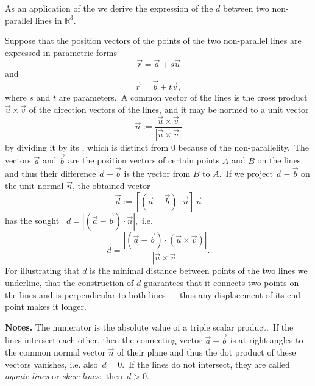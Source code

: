 \documentclass{article}
\theoremstyle{definition}
\begin{document}
As an application of the  we derive the expression of the  $d$ between two non-parallel  lines in $\mathbb{R}^3$.

Suppose that the position vectors of the points of the two non-parallel lines are expressed in parametric forms
           $$\vec{r} = \vec{a}\!+\!s\vec{u}$$
and
           $$\vec{r} = \vec{b}\!+\!t\vec{v},$$
where $s$ and $t$ are parameters.\, A common  vector of the lines is the cross product $\vec{u}\times\vec{v}$ of the direction vectors of the lines, and it may be normed to a unit vector
      $$\vec{n} := \frac{\vec{u}\!\times\!\vec{v}}{|\vec{u}\!\times\!\vec{v}|}$$
by dividing it by its , which is distinct from 0 because of the non-parallelity.\, The vectors $\vec{a}$ and $\vec{b}$ are the position vectors of certain points $A$ and $B$ on the lines, and thus their difference $\vec{a}\!-\!\vec{b}$ is the vector from $B$ to $A$.\, If we project $\vec{a}\!-\!\vec{b}$ on the unit normal $\vec{n}$, the obtained vector
       $$\vec{d} := [(\vec{a}\!-\!\vec{b})\!\cdot\!\vec{n}]\,\vec{n}$$
has the sought \, 
$d = |(\vec{a}\!-\!\vec{b})\!\cdot\!\vec{n}|$,\, i.e.
$$d = \frac{|(\vec{a}\!-\!\vec{b})\cdot(\vec{u}\!\times\!\vec{v})|}{|\vec{u}\!\times\!\vec{v}|}.
$$
For illustrating that $d$ is the minimal distance between points of the two lines we underline, that the construction of $d$ guarantees that it connects two points on the lines and is perpendicular to both lines --- thus any displacement of its end point makes it longer.

\textbf{Notes.}\; The numerator is the absolute value of a triple scalar product.\, If the lines intersect each other, then the connecting vector $\vec{a}\!-\!\vec{b}$ is at right angles to the common normal vector $\vec{n}$ of their plane and thus the dot product of these vectors vanishes, i.e. also\, $d = 0$.\, If the lines do not intersect, they are called {\em agonic lines} or {\em skew lines};\, then\, $d > 0$.
\end{document}
